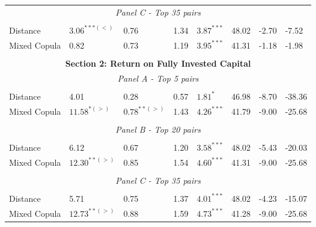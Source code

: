 \documentclass[a4paper,12pt]{report}
\begin{document}
\begin{refsection}
\begin{threeparttable}[H]
\begin{tabularx}{\textwidth}{@{\extracolsep{\fill}}llllllll@{}}
			\multicolumn{8}{c}{\textit{Panel C - Top 35 pairs}} \\
			&       &       &       &       &       &       &  \\
			Distance &  $3.06^{***(<)}$ &  0.76  & 1.34  & $3.87^{***}$  & 48.02 & -2.70  & -7.52 \\
			Mixed Copula & 0.82  & 0.73  & 1.19  & $3.95^{***}$  & 41.31 &  -1.18  &  -1.98  \\
			\multicolumn{1}{r}{} & \multicolumn{1}{r}{} & \multicolumn{1}{r}{} & \multicolumn{1}{r}{} & \multicolumn{1}{r}{} & \multicolumn{1}{r}{} & \multicolumn{1}{r}{} & \multicolumn{1}{r}{} \\
			\midrule
			\multicolumn{8}{c}{\textbf{Section 2: Return on Fully Invested Capital}} \\
			\multicolumn{8}{c}{\textit{Panel A - Top 5 pairs}} \\
			&       &       &       &       &       &       &  \\
			Distance & 4.01  & 0.28  & 0.57  & $1.81^{*}$  & 46.98 & -8.70    & -38.36  \\
			Mixed Copula & $11.58^{*(>)}$  & $0.78^{**(>)}$  & 1.43  & $4.26^{***}$  & 41.79 & -9.00  & -25.68 \\
			\multicolumn{1}{r}{} & \multicolumn{1}{r}{} & \multicolumn{1}{r}{} & \multicolumn{1}{r}{} & \multicolumn{1}{r}{} & \multicolumn{1}{r}{} & \multicolumn{1}{r}{} & \multicolumn{1}{r}{} \\
			\multicolumn{8}{c}{\textit{Panel B - Top 20 pairs}} \\
			&       &       &       &       &       &       &  \\
			Distance & 6.12  & 0.67  & 1.20  & $3.58^{***}$  & 48.02 & -5.43  & -20.03 \\
			Mixed Copula  & $12.30^{**(>)}$  & 0.85  & 1.54  & $4.60^{***}$  & 41.31 & -9.00  & -25.68  \\
			\multicolumn{1}{r}{} & \multicolumn{1}{r}{} & \multicolumn{1}{r}{} & \multicolumn{1}{r}{} & \multicolumn{1}{r}{} & \multicolumn{1}{r}{} & \multicolumn{1}{r}{} & \multicolumn{1}{r}{} \\
			\multicolumn{8}{c}{\textit{Panel C - Top 35 pairs}} \\
			&       &       &       &       &       &       &  \\
			Distance & 5.71  & 0.75  & 1.37  & $4.01^{***}$  & 48.02 & -4.23  & -15.07 \\
			Mixed Copula & $12.73^{**(>)}$  & 0.88  & 1.59  & $4.73^{***}$  & 41.28 & -9.00  & -25.68  \\

\end{tabularx}
\end{threeparttable}
\end{refsection}
\end{document}
